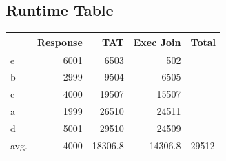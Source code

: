 \documentclass[a4paper,11pt,twoside]{article}
\begin{document}
\subsection*{Runtime Table}
\label{sec:orgd169b5b}
\begin{center}
\begin{tabular}{lrrrl}
 & Response & TAT & Exec Join & Total\\[0pt]
\hline
e & 6001 & 6503 & 502 & \\[0pt]
b & 2999 & 9504 & 6505 & \\[0pt]
c & 4000 & 19507 & 15507 & \\[0pt]
a & 1999 & 26510 & 24511 & \\[0pt]
d & 5001 & 29510 & 24509 & \\[0pt]
\hline
avg. & 4000 & 18306.8 & 14306.8 & 29512\\[0pt]
\end{tabular}
\end{center}
\end{document}

